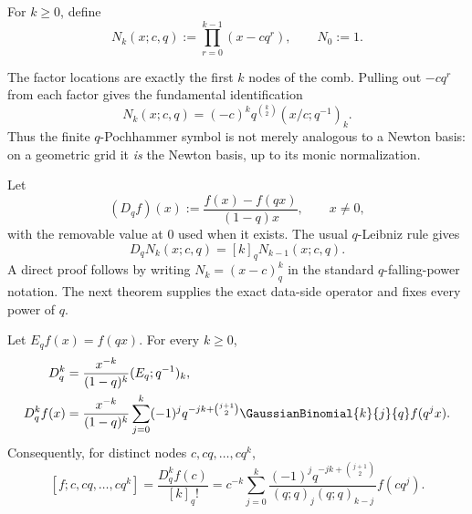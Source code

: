 \begin{definition}
For $k\ge0$, define
\begin{equation}
 N_k(x;c,q):=\prod_{r=0}^{k-1}(x-cq^r),
 \qquad N_0:=1.
 \label{gq:eq:newton-basis}
\end{equation}
\end{definition}

The factor locations are exactly the first $k$ nodes of the comb.  Pulling
out $-cq^r$ from each factor gives the fundamental identification
\begin{equation}
 \boxed{
 N_k(x;c,q)=(-c)^kq^{\binom k2}(x/c;q^{-1})_k.}
 \label{gq:eq:newton-pochhammer}
\end{equation}
Thus the finite $q$-Pochhammer symbol is not merely analogous to a Newton
basis: on a geometric grid it \emph{is} the Newton basis, up to its monic
normalization.

Let
\begin{equation}
 (D_qf)(x):=\frac{f(x)-f(qx)}{(1-q)x},
 \qquad x\ne0,
 \label{gq:eq:Dq}
\end{equation}
with the removable value at $0$ used when it exists.  The usual $q$-Leibniz
rule gives
\begin{equation}
 D_qN_k(x;c,q)=[k]_qN_{k-1}(x;c,q).
 \label{gq:eq:Dq-newton}
\end{equation}
A direct proof follows by writing $N_k=(x-c)_{q}^{k}$ in the standard
$q$-falling-power notation.  The next theorem supplies the exact data-side
operator and fixes every power of $q$.

\begin{theorem}
\label{gq:thm:Dq-divided-difference}
Let $E_qf(x)=f(qx)$.  For every $k\ge0$,
\begin{align}
 D_q^k
 &=\frac{x^{-k}}{(1-q)^k}(E_q;q^{-1})_k,
 \label{gq:eq:Dq-operator-factor}\\
 D_q^kf(x)
 &=\frac{x^{-k}}{(1-q)^k}
   \sum_{j=0}^k(-1)^j
   q^{-jk+\binom{j+1}{2}}\GaussianBinomial{k}{j}{q}f(q^jx).
 \label{gq:eq:Dq-explicit}
\end{align}
Consequently, for distinct nodes $c,cq,\ldots,cq^k$,
\begin{equation}
 \boxed{
 [f;c,cq,\ldots,cq^k]
 =\frac{D_q^kf(c)}{[k]_q!}
 =c^{-k}\sum_{j=0}^k
 \frac{(-1)^jq^{-jk+\binom{j+1}{2}}}
 {(q;q)_j(q;q)_{k-j}}f(cq^j).}
 \label{gq:eq:geometric-divided-difference}
\end{equation}
\end{theorem}


